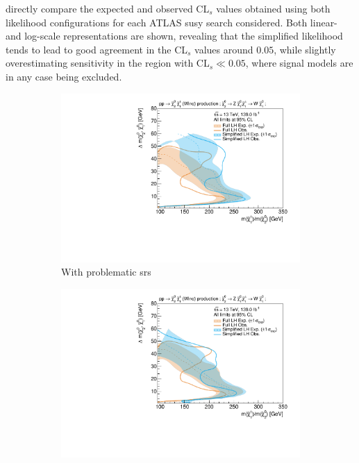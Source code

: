  directly compare the expected and observed CL$_s$ values obtained using both likelihood configurations for each ATLAS \gls{susy} search considered. Both linear- and log-scale representations are shown, revealing that the simplified likelihood tends to lead to good agreement in the CL$_s$ values around $0.05$, while slightly overestimating sensitivity in the region with CL$_s \ll 0.05$, where signal models are in any case being excluded.
\begin{figure}[H]
	\centering
	\captionsetup[subfigure]{aboveskip=-3pt,belowskip=-2pt}
	\begin{subfigure}[b]{0.47\textwidth}
		\centering\includegraphics[width=\textwidth]{exclusion_compressed_noCRs_noLabel_v2}
		\caption{With problematic \glspl{sr}\label{fig:exclusion_compressed_CLs_noLabel_v2_withCRs}}
	\end{subfigure}\hfill
	\begin{subfigure}[b]{0.47\textwidth}
		\centering\includegraphics[width=\textwidth]{exclusion_compressed_noLabel_v2}

\end{subfigure}
\end{figure}
